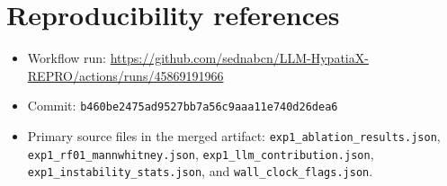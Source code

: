 \documentclass[11pt,a4paper]{article}
\begin{document}
\section{Reproducibility references}
\begin{itemize}[leftmargin=*]
\item Workflow run: \url{https://github.com/sednabcn/LLM-HypatiaX-REPRO/actions/runs/45869191966}
\item Commit: \texttt{b460be2475ad9527bb7a56c9aaa11e740d26dea6}
\item Primary source files in the merged artifact: \texttt{exp1\_ablation\_results.json},
\texttt{exp1\_rf01\_mannwhitney.json}, \texttt{exp1\_llm\_contribution.json},
\texttt{exp1\_instability\_stats.json}, and \texttt{wall\_clock\_flags.json}.
\end{itemize}
\end{document}
